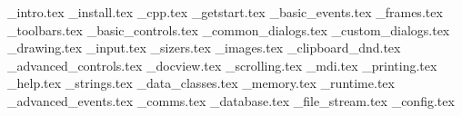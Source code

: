 \_intro.tex              %
\_install.tex            %
\_cpp.tex                %
\_getstart.tex           %
\_basic\_events.tex      %
\_frames.tex             %
\_toolbars.tex           %
\_basic\_controls.tex    %
\_common\_dialogs.tex    %
\_custom\_dialogs.tex    %
\_drawing.tex            %
\_input.tex              %
\_sizers.tex             %
\_images.tex             %
\_clipboard\_dnd.tex     %
\_advanced\_controls.tex %
\_docview.tex            %
\_scrolling.tex          %
\_mdi.tex                %
\_printing.tex           %
\_help.tex               %
\_strings.tex            %
\_data\_classes.tex      %
\_memory.tex             %
\_runtime.tex            %
\_advanced\_events.tex   %
\_comms.tex              %
\_database.tex           %
\_file\_stream.tex       %
\_config.tex             %
